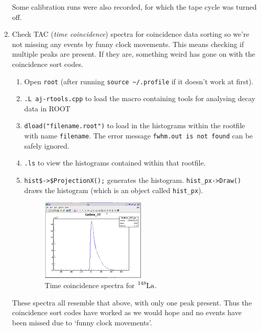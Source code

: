\documentclass{article}
\begin{document}
\begin{enumerate}
\medskip
\noindent
Some calibration runs were also recorded, for which the tape cycle was turned off. 

\item Check TAC (\textit{time coincidence}) spectra for coincidence data sorting so we're not missing any events by funny clock movements. 
This means checking if multiple peaks are present.
If they are, something weird has gone on with the coincidence sort codes.
\begin{enumerate}
\item Open \verb#root# (after running \verb#source ~/.profile# if it doesn't work at first).
\item \verb#.L aj-rtools.cpp# to load the macro containing tools for analysing decay data in ROOT
\item \verb#dload("filename.root")# to load in the histograms within the rootfile with name \verb#filename#. The error message \verb#fwhm.out is not found# can be safely ignored.
\item \verb#.ls# to view the histograms contained within that rootfile.
\item \verb#hist$->$ProjectionX();# generates the histogram. \verb#hist_px->Draw()# draws the histogram (which is an object called \verb#hist_px#).
\begin{figure}[htbp]
	\centering
	\includegraphics[width=0.5\textwidth]{../CNData/LaDecayTACspectra/148LaTACspectra.png}
	\caption{Time coincidence spectra for $\ce{^{148}La}$.}
	\label{fig:148la}
\end{figure}
\end{enumerate}
These spectra all resemble that above, with only one peak present. Thus the coincidence sort codes have worked as we would hope and no events have been missed due to `funny clock movements'.


\end{enumerate}
\end{document}
